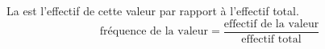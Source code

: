 La  est l'effectif de cette valeur par rapport
à l'effectif total.
$$\text{fréquence de la valeur}=\dfrac{\text{effectif de la valeur}}
{\text{effectif total}}$$